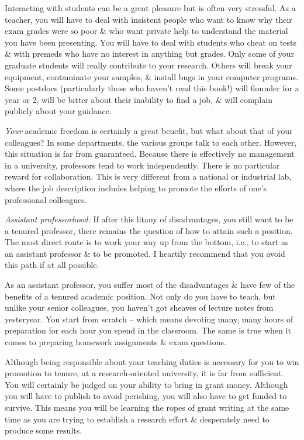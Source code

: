 \documentclass{article}
\begin{document}
\begin{enumerate}
\begin{itemize}
\begin{itemize}
			Interacting with students can be a great pleasure but is often very stressful. As a teacher, you will have to deal with insistent people who want to know why their exam grades were so poor \& who want private help to understand the material you have been presenting. You will have to deal with students who cheat on tests \& with premeds who have no interest in anything but grades. Only some of your graduate students will really contribute to your research. Others will break your equipment, contaminate your samples, \& install bugs in your computer programs. Some postdocs (particularly those who haven't read this book!) will flounder for a year or 2, will be bitter about their inability to find a job, \& will complain publicly about your guidance.
			
			\textit{Your} academic freedom is certainly a great benefit, but what about that of your colleagues? In some departments, the various groups talk to each other. However, this situation is far from guaranteed. Because there is effectively no management in a university, professors tend to work independently. There is no particular reward for collaboration. This is very different from a national or industrial lab, where the job description includes helping to promote the efforts of one's professional colleagues.
			
			\textit{Assistant professorhood:} If after this litany of disadvantages, you still want to be a tenured professor, there remains the question of how to attain such a position. The most direct route is to work your way up from the bottom, i.e., to start as an assistant professor \& to be promoted. I heartily recommend that you avoid this path if at all possible.
			
			As an assistant professor, you suffer most of the disadvantages \& have few of the benefits of a tenured academic position. Not only do you have to teach, but unlike your senior colleagues, you haven't got sheaves of lecture notes from yesteryear. You start from scratch -- which means devoting many, many hours of preparation for each hour you spend in the classroom. The same is true when it comes to preparing homework assignments \& exam questions.
			
			Although being responsible about your teaching duties is necessary for you to win promotion to tenure, at a research-oriented university, it is far from sufficient. You will certainly be judged on your ability to bring in grant money. Although you will have to publish to avoid perishing, you will also have to get funded to survive. This means you will be learning the ropes of grant writing at the same time as you are trying to establish a research effort \& desperately need to produce some results.
			

\end{itemize}
\end{itemize}
\end{enumerate}
\end{document}
